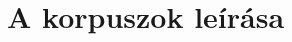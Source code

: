 \documentclass[utf8x,t]{beamer}
\newcommand{\vitem}{\item \vspace{4pt}}
\begin{document}


\section{A korpuszok leírása}
\end{document}
